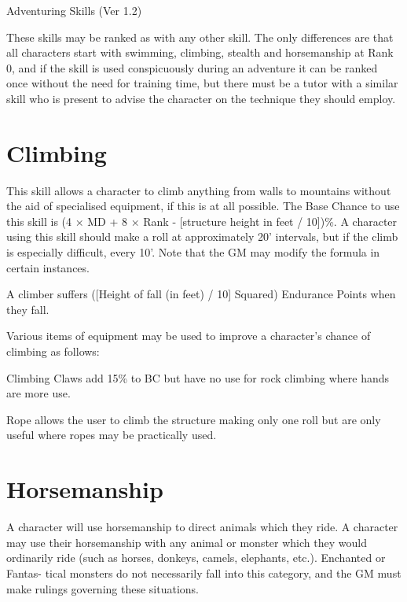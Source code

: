 \begin{Chapter}{Adventuring Skills (Ver 1.2)}

These skills may be ranked as with any other skill.  The only
differences are that all characters start with swimming, climbing,
stealth and horsemanship at Rank 0, and if the skill is used
conspicuously during an adventure it can be ranked once without the
need for training time, but there must be a tutor with a similar skill
who is present to advise the character on the technique they should
employ.

\section{Climbing}

This skill allows a character to climb anything from walls to
mountains without the aid of specialised equipment, if this is at all
possible.  The Base Chance to use this skill is (4 × MD + 8 × Rank -
[structure height in feet / 10])\%.  A character using this skill
should make a roll at approximately 20’ intervals, but if the climb is
especially difficult, every 10’.  Note that the GM may modify the
formula in certain instances.

A climber suffers ([Height of fall (in feet) / 10] Squared) Endurance
Points when they fall.

Various items of equipment may be used to improve a character’s chance
of climbing as follows:
\begin{Itemize}
  
\item Climbing Claws add 15\% to BC but have no use for rock climbing
  where hands are more use.

\item Rope allows the user to climb the structure making only one roll
  but are only useful where ropes may be practically used.

\end{Itemize}

\section{Horsemanship}

A character will use horsemanship to direct animals which they ride.
A character may use their horsemanship with any animal or monster
which they would ordinarily ride (such as horses, donkeys, camels,
elephants, etc.). Enchanted or Fantas- tical monsters do not
necessarily fall into this category, and the GM must make rulings
governing these situations.


\end{Chapter}
